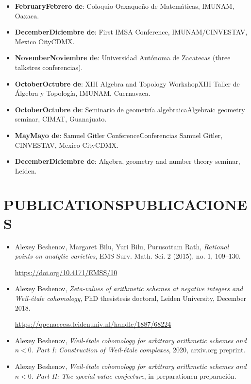 \documentclass{article}
\newcommand{\biling}[2]{\ifdefined\english#1\fi\ifdefined\spanish#2\fi}
\begin{document}
\begin{itemize}
\item \textbf{\biling{February}{Febrero de} 2020}: Coloquio Oaxaqueño de Matemáticas,
  IMUNAM, Oaxaca.

\item \textbf{\biling{December}{Diciembre de} 2019}: First IMSA Conference,
  IMUNAM/CINVESTAV, \biling{Mexico City}{CDMX}.

\item \textbf{\biling{November}{Noviembre de} 2019}: Universidad Autónoma de Zacatecas
  (\biling{three talks}{tres conferencias}).

\item \textbf{\biling{October}{Octubre de} 2019}: \biling{XIII Algebra and Topology Workshop}{XIII Taller de Álgebra y Topología},
  IMUNAM, Cuernavaca.

\item \textbf{\biling{October}{Octubre de} 2019}: \biling{Seminario de geometría algebraica}{Algebraic geometry seminar},
  CIMAT, Guanajuato.

\item \textbf{\biling{May}{Mayo de} 2019}: \biling{Samuel Gitler Conference}{Conferencias Samuel Gitler},
  CINVESTAV, \biling{Mexico City}{CDMX}.

\item \textbf{\biling{December}{Diciembre de} 2017}:
  Algebra, geometry and number theory seminar, Leiden.
\end{itemize}

{\color{RoyalBlue}\section*{\biling{PUBLICATIONS}{PUBLICACIONES}}}

\begin{itemize}
\item Alexey Beshenov, Margaret Bilu, Yuri Bilu, Purusottam Rath,
  \emph{Rational points on analytic varieties},
  EMS Surv. Math. Sci. 2 (2015), no. 1, 109–130.

  \url{https://doi.org/10.4171/EMSS/10}

\item Alexey Beshenov,
  \emph{Zeta-values of arithmetic schemes at negative integers and Weil-étale cohomology},
  \biling{PhD thesis}{tesis doctoral}, Leiden University, December 2018.

  \url{https://openaccess.leidenuniv.nl/handle/1887/68224}

\item Alexey Beshenov,
  \emph{Weil-étale cohomology for arbitrary arithmetic schemes and $n < 0$.
    Part I: Construction of Weil-étale complexes},
  2020, arxiv.org preprint.

\item Alexey Beshenov,
  \emph{Weil-étale cohomology for arbitrary arithmetic schemes and $n < 0$.
    Part II: The special value conjecture},
  \biling{in preparation}{en preparación}.
\end{itemize}
\end{document}
